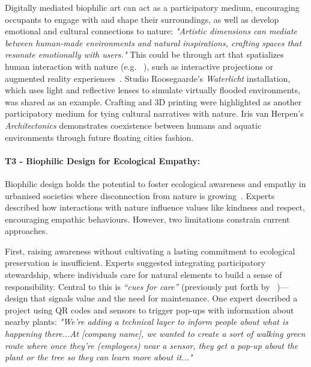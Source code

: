 Digitally mediated biophilic art can act as a participatory medium, encouraging occupants to engage with and shape their surroundings, as well as develop emotional and cultural connections to nature:  \textit{"Artistic dimensions can mediate between human-made environments and natural inspirations, crafting spaces that resonate emotionally with users."} This could be through art that spatializes human interaction with nature (e.g. ~\cite{marchart1998art}), such as interactive projections or augmented reality experiences~\cite{shepard2011sentient}. Studio Roosegaarde’s \textit{Waterlicht} installation, which uses light and reflective lenses to simulate virtually flooded environments, was shared as an example. Crafting and 3D printing were highlighted as another participatory medium for tying cultural narratives with nature. Iris van Herpen’s \textit{Architectonics} demonstrates coexistence between humans and aquatic environments through future floating cities fashion.



\paragraph{T3 - Biophilic Design for Ecological Empathy:}
\label{theme:t3}
Biophilic design holds the potential to foster ecological awareness and empathy in urbanised societies where disconnection from nature is growing~\cite{li2022re,wang2022nature}. Experts described how interactions with nature influence values like kindness and respect, encouraging empathic behaviours. However, two limitations constrain current approaches.

First, raising awareness without cultivating a lasting commitment to ecological preservation is insufficient. Experts suggested integrating participatory stewardship, where individuals care for natural elements to build a sense of responsibility. Central to this is \emph{``cues for care''} (previously put forth by ~\citet{nassauer1995messy})---design that signals value and the need for maintenance. One expert described a project using QR codes and sensors to trigger pop-ups with information about nearby plants: \textit{"We're adding a technical layer to inform people about what is happening there...At [company name], we wanted to create a sort of walking green route where once they're (employees) near a sensor, they get a pop-up about the plant or the tree so they can learn more about it..."} 

